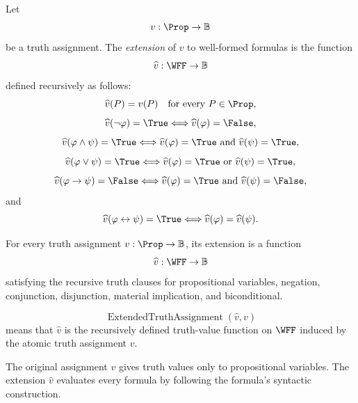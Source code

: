 \begin{tcolorbox}[colback=propbox, colframe=propborder, arc=2pt,
  left=6pt, right=6pt, top=4pt, bottom=4pt,
  title={\small\textbf{Definition (Extension of a Truth Assignment to Formulas)}},
  fonttitle=\small\bfseries]
\begin{definition}
\label{def:extended-truth-assignment-propositional-logic}
Let
\[
v:\Prop\to\mathbb{B}
\]
be a truth assignment. The \emph{extension} of \(v\) to well-formed formulas is
the function
\[
\widehat v:\WFF\to\mathbb{B}
\]
defined recursively as follows:
\[
\widehat v(P)=v(P)
\quad\text{for every }P\in\Prop,
\]
\[
\widehat v(\neg\varphi)=\True
\Longleftrightarrow
\widehat v(\varphi)=\False,
\]
\[
\widehat v(\varphi\land\psi)=\True
\Longleftrightarrow
\widehat v(\varphi)=\True
\text{ and }
\widehat v(\psi)=\True,
\]
\[
\widehat v(\varphi\lor\psi)=\True
\Longleftrightarrow
\widehat v(\varphi)=\True
\text{ or }
\widehat v(\psi)=\True,
\]
\[
\widehat v(\varphi\to\psi)=\False
\Longleftrightarrow
\widehat v(\varphi)=\True
\text{ and }
\widehat v(\psi)=\False,
\]
and
\[
\widehat v(\varphi\leftrightarrow\psi)=\True
\Longleftrightarrow
\widehat v(\varphi)=\widehat v(\psi).
\]
\end{definition}
\end{tcolorbox}

\begin{remark*}
For every truth assignment \(v:\Prop\to\mathbb{B}\), its extension is a function
\[
\widehat v:\WFF\to\mathbb{B}
\]
satisfying the recursive truth clauses for propositional variables, negation,
conjunction, disjunction, material implication, and biconditional.
\end{remark*}

\begin{remark*}
\[
\operatorname{ExtendedTruthAssignment}(\widehat v,v)
\]
means that \(\widehat v\) is the recursively defined truth-value function on
\(\WFF\) induced by the atomic truth assignment \(v\).
\end{remark*}

\begin{remark*}[Interpretation]
The original assignment \(v\) gives truth values only to propositional variables.
The extension \(\widehat v\) evaluates every formula by following the formula's
syntactic construction.
\end{remark*}

